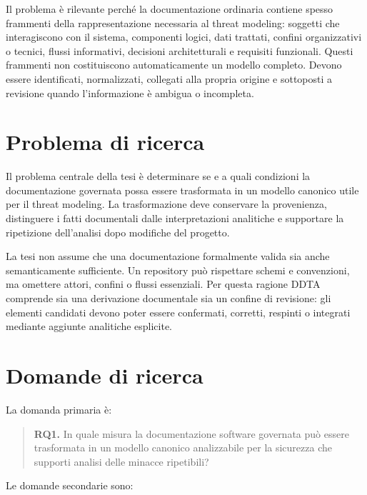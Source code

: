 \documentclass[12pt,a4paper,oneside]{report}
\begin{document}
Il problema è rilevante perché la documentazione ordinaria contiene spesso frammenti della rappresentazione necessaria al threat modeling: soggetti che interagiscono con il sistema, componenti logici, dati trattati, confini organizzativi o tecnici, flussi informativi, decisioni architetturali e requisiti funzionali. Questi frammenti non costituiscono automaticamente un modello completo. Devono essere identificati, normalizzati, collegati alla propria origine e sottoposti a revisione quando l'informazione è ambigua o incompleta.

\section{Problema di ricerca}

Il problema centrale della tesi è determinare se e a quali condizioni la documentazione governata possa essere trasformata in un modello canonico utile per il threat modeling. La trasformazione deve conservare la provenienza, distinguere i fatti documentali dalle interpretazioni analitiche e supportare la ripetizione dell'analisi dopo modifiche del progetto.

La tesi non assume che una documentazione formalmente valida sia anche semanticamente sufficiente. Un repository può rispettare schemi e convenzioni, ma omettere attori, confini o flussi essenziali. Per questa ragione DDTA comprende sia una derivazione documentale sia un confine di revisione: gli elementi candidati devono poter essere confermati, corretti, respinti o integrati mediante aggiunte analitiche esplicite.

\section{Domande di ricerca}

La domanda primaria è:

\begin{quote}
\textbf{RQ1.} In quale misura la documentazione software governata può essere trasformata in un modello canonico analizzabile per la sicurezza che supporti analisi delle minacce ripetibili?
\end{quote}

Le domande secondarie sono:
\end{document}
